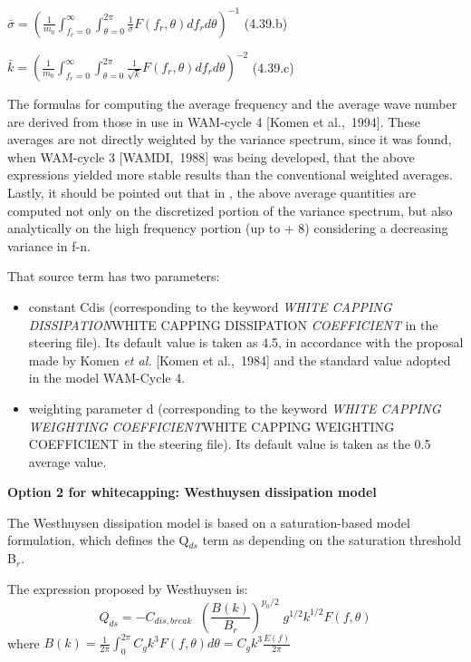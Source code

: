 $\bar{\sigma }=\left(\frac{1}{m_{0} } \int _{f_{r} =0}^{\infty }\int _{\theta =0}^{2\pi } \frac{1}{\sigma }  F(f_{r} ,\theta )df_{r} d\theta \right)^{-1} $ (4.39.b)

$\bar{k}=\left(\frac{1}{m_{0} } \int _{f_{r} =0}^{\infty }\int _{\theta =0}^{2\pi } \frac{1}{\sqrt{k} }  F(f_{r} ,\theta )df_{r} d\theta \right)^{-2} $ (4.39.c)

 The formulas for computing the average frequency and the average wave number are derived from those in use in WAM-cycle 4 [Komen et al.,~1994]. These averages are not directly weighted by the variance spectrum, since it was found, when WAM-cycle 3 [WAMDI,~1988] was being developed, that the above expressions yielded more stable results than the conventional weighted averages. Lastly, it should be pointed out that in \tomawac, the above average quantities are computed not only on the discretized portion of the variance spectrum, but also analytically on the high frequency portion (up to + 8) considering a decreasing variance in f-n.

That source term has two parameters:

\begin{itemize}
\item  constant Cdis (corresponding to the keyword \textit{WHITE CAPPING DISSIPATION}WHITE CAPPING DISSIPATION\textit{ COEFFICIENT }in the steering file). Its default value is taken as 4.5, in accordance with the proposal made by Komen \textit{et al.} [Komen et al.,~1984] and the standard value adopted in the model WAM-Cycle 4.

\item  weighting parameter d (corresponding to the keyword \textit{WHITE CAPPING WEIGHTING COEFFICIENT}WHITE CAPPING WEIGHTING COEFFICIENT\textit{ }in the steering file). Its default value is taken as the 0.5 average value.
\end{itemize}


{\bf  Option 2 for whitecapping: Westhuysen dissipation model}

 The Westhuysen dissipation model \cite{Westhuys2007} is based on a saturation-based model formulation, which defines the Q${}_{ds}$ term as depending on the saturation threshold B${}_{r}$.

 The expression proposed by Westhuysen is:
\begin{equation} \label{GrindEQ__4_40_}
Q_{ds} =-C_{dis,break} \; \; \left(\frac{B(k)}{B_{r} } \right)^{p_{0} /2} \; g^{1/2} k^{1/2} F(f,\theta )
\end{equation}
where $B(k)=\frac{1}{2\pi } \int _{0}^{2\pi }C_{g} k^{3} F(f,\theta )d\theta  =C_{g} k^{3} \frac{E(f)}{2\pi } $

